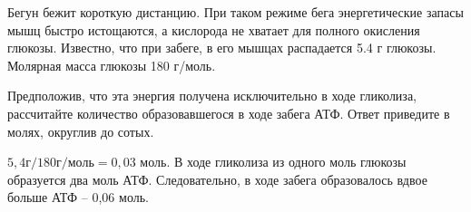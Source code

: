 
Бегун бежит короткую
дистанцию. При таком режиме бега энергетические запасы мышц быстро истощаются,
а кислорода не хватает для полного окисления глюкозы. Известно, что при забеге,
в его мышцах распадается 5.4 г глюкозы. Молярная масса глюкозы 180 г/моль.

Предположив, что эта энергия получена исключительно в ходе гликолиза, рассчитайте количество образовавшегося в ходе забега АТФ. Ответ приведите в
молях, округлив до сотых.

\soultionSection

$5,4 \text{г} / 180 \text{г} / \text{моль} = 0,03$ моль. В ходе гликолиза из одного моль глюкозы 
образуется два моль АТФ. Следовательно, в ходе забега образовалось вдвое больше АТФ – 0,06 моль.

